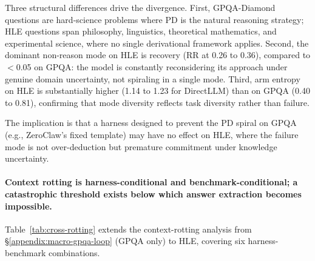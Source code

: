 Three structural differences drive the divergence.
First, GPQA-Diamond questions are hard-science problems where PD is the
natural reasoning strategy; HLE questions span philosophy, linguistics,
theoretical mathematics, and experimental science, where no single
derivational framework applies.
Second, the dominant non-reason mode on HLE is recovery (RR at 0.26 to
0.36), compared to $<$0.05 on GPQA: the model is constantly reconsidering
its approach under genuine domain uncertainty, not spiraling in a single
mode.
Third, arm entropy on HLE is substantially higher (1.14 to 1.23 for
DirectLLM) than on GPQA (0.40 to 0.81), confirming that mode diversity
reflects task diversity rather than failure.

The implication is that a harness designed to prevent the PD spiral on
GPQA (e.g., ZeroClaw's fixed template) may have no effect on HLE, where
the failure mode is not over-deduction but premature commitment under
knowledge uncertainty.

\paragraph{Context rotting is harness-conditional and benchmark-conditional;
a catastrophic threshold exists below which answer extraction becomes
impossible.}

Table~\ref{tab:cross-rotting} extends the context-rotting analysis from
\S\ref{appendix:macro-gpqa-loop} (GPQA only) to HLE, covering six
harness-benchmark combinations.


